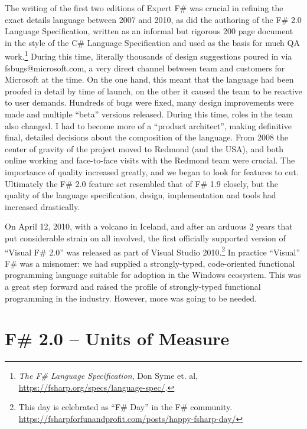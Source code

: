 \documentclass[acmsmall,review]{acmart}\settopmatter{printfolios=true,printccs=false,printacmref=false}
\begin{document}
The writing of the first two editions of Expert F\# was crucial in refining the exact details language between 2007 and 2010, as did the
authoring of the F\# 2.0 Language Specification, written as an informal but rigorous 200 page document in
the style of the C\# Language Specification and used as the basis for much QA work.\footnote{\textit{The F\# Language Specification}, Don Syme et. al, \url{https://fsharp.org/specs/language-spec/}.}
During this time, literally thousands of design suggestions poured in via fsbugs@microsoft.com, a very direct channel between team and
customers for Microsoft at the time. On the one hand, this meant that the language had been proofed in detail by time of launch, on the
other it caused the team to be reactive to user demands.  Hundreds of bugs were fixed, many design improvements were made and
multiple “beta” versions released.  During this time, roles in the team also changed.  I had to become more of a “product architect”, making
definitive final, detailed decisions about the composition of the language.  From 2008 the center of gravity of the project moved to
Redmond (and the USA), and both online working and face-to-face visits with the Redmond team were crucial.  The importance of
quality increased greatly, and we began to look for features to cut.  Ultimately the F\# 2.0 feature set resembled that of F\# 1.9 closely,
but the quality of the language specification, design, implementation and tools had increased drastically.

On April 12, 2010, with a volcano in Iceland, and after an arduous 2 years that put considerable strain on all involved, the first officially
supported version of “Visual F\# 2.0” was released as part of Visual Studio
2010.\footnote{This day is celebrated as “F\# Day” in the F\# community. \url{https://fsharpforfunandprofit.com/posts/happy-fsharp-day/}}
In practice “Visual” F\# was a misnomer: we had supplied a strongly-typed, code-oriented functional programming language
suitable for adoption in the Windows ecosystem.  This was a great step forward and raised the profile of strongly-typed functional
programming in the industry. However, more was going to be needed. 



\section*{F\# 2.0 – Units of Measure }
\end{document}
